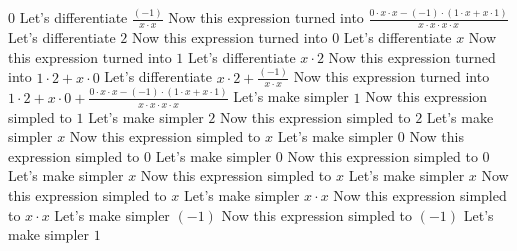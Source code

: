 \documentclass[14pt]{article}
\begin{document}
$0$
\newline
Let's differentiate 
$\frac {(-1)}{x\cdot x}$
\newline
Now this expression turned into 
$\frac {0\cdot x\cdot x-(-1)\cdot (1\cdot x+x\cdot 1)}{x\cdot x\cdot x\cdot x}$
\newline
Let's differentiate 
$2$
\newline
Now this expression turned into 
$0$
\newline
Let's differentiate 
$x$
\newline
Now this expression turned into 
$1$
\newline
Let's differentiate 
$x\cdot 2$
\newline
Now this expression turned into 
$1\cdot 2+x\cdot 0$
\newline
Let's differentiate 
$x\cdot 2+\frac {(-1)}{x\cdot x}$
\newline
Now this expression turned into 
$1\cdot 2+x\cdot 0+\frac {0\cdot x\cdot x-(-1)\cdot (1\cdot x+x\cdot 1)}{x\cdot x\cdot x\cdot x}$
\newline
Let's make simpler 
$1$
\newline
Now this expression simpled to 
$1$
\newline
Let's make simpler 
$2$
\newline
Now this expression simpled to 
$2$
\newline
Let's make simpler 
$x$
\newline
Now this expression simpled to 
$x$
\newline
Let's make simpler 
$0$
\newline
Now this expression simpled to 
$0$
\newline
Let's make simpler 
$0$
\newline
Now this expression simpled to 
$0$
\newline
Let's make simpler 
$x$
\newline
Now this expression simpled to 
$x$
\newline
Let's make simpler 
$x$
\newline
Now this expression simpled to 
$x$
\newline
Let's make simpler 
$x\cdot x$
\newline
Now this expression simpled to 
$x\cdot x$
\newline
Let's make simpler 
$(-1)$
\newline
Now this expression simpled to 
$(-1)$
\newline
Let's make simpler 
$1$
\newline
\end{document}
